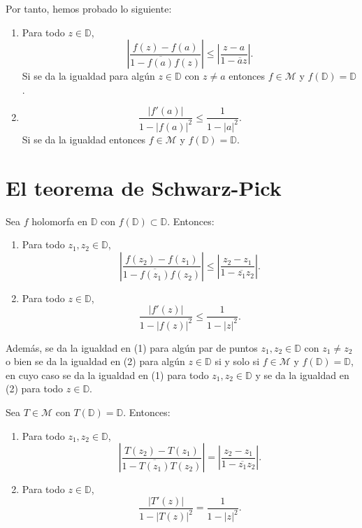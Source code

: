 Por tanto, hemos probado lo siguiente:
\begin{enumerate}
    \item Para todo $z \in \mathbb{D}$,
          $$\left|\frac{f(z)-f(a)}{1-\overline{f(a)}f(z)}\right| \leq \left|\frac{z-a}{1-\overline{a}z}\right|.$$
          Si se da la igualdad para algún $z \in \mathbb{D}$ con $z \neq a$ entonces $f \in \mathcal{M}$ y $f(\mathbb{D}) = \mathbb{D}$.
    \item $$\frac{|f'(a)|}{1-|f(a)|^2} \leq \frac{1}{1-|a|^2}.$$
          Si se da la igualdad entonces $f \in \mathcal{M}$ y $f(\mathbb{D}) = \mathbb{D}$.
\end{enumerate}

\section{El teorema de Schwarz-Pick}
\begin{theorem}
    Sea $f$ holomorfa en $\mathbb{D}$ con $f(\mathbb{D}) \subset \mathbb{D}$.
    Entonces:
    \begin{enumerate}
        \item Para todo $z_1, z_2 \in \mathbb{D}$,
              $$\left|\frac{f(z_2)-f(z_1)}{1-\overline{f(z_1)}f(z_2)}\right| \leq \left|\frac{z_2-z_1}{1-\overline{z_1}z_2}\right|.$$
        \item Para todo $z \in \mathbb{D}$,
              $$\frac{|f'(z)|}{1-|f(z)|^2} \leq \frac{1}{1-|z|^2}.$$
    \end{enumerate}

    Además, se da la igualdad en (1) para algún par de puntos $z_1, z_2 \in \mathbb{D}$ con $z_1 \neq z_2$ o bien se da la igualdad en (2) para algún $z \in \mathbb{D}$ si y solo si $f \in \mathcal{M}$ y $f(\mathbb{D}) = \mathbb{D}$, en cuyo caso se da la igualdad en (1) para todo $z_1, z_2 \in \mathbb{D}$ y se da la igualdad en (2) para todo $z \in \mathbb{D}$.
\end{theorem}

\begin{proposition}
    Sea $T \in \mathcal{M}$ con $T(\mathbb{D}) = \mathbb{D}$.
    Entonces:
    \begin{enumerate}
        \item Para todo $z_1, z_2 \in \mathbb{D}$,
              $$\left|\frac{T(z_2)-T(z_1)}{1-\overline{T(z_1)}T(z_2)}\right| = \left|\frac{z_2-z_1}{1-\overline{z_1}z_2}\right|.$$
        \item Para todo $z \in \mathbb{D}$,
              $$\frac{|T'(z)|}{1-|T(z)|^2} = \frac{1}{1-|z|^2}.$$
    \end{enumerate}
\end{proposition}

